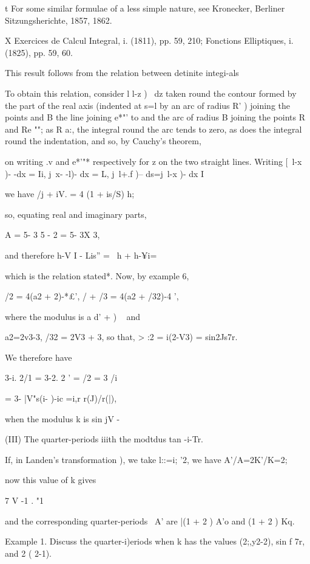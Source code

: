 t For some similar formulae of a less simple nature, see Kronecker,
Berliner Sitzungsherichte, 1857, 1862.

X Exercices de Calcul Integral, i. (1811), pp. 59, 210; Fonctions
Elliptiques, i. (1825), pp. 59, 60.

%
%

This result follows from the relation between detinite integi-als

To obtain this relation, consider l l-z )~ dz taken round the contour
formed by the part of the real axis (indented at s=l by an arc of
radius R' ) joining the points and B the line joining e*"' to and the
arc of radius B joining the points R and Re ""; as R a:, the
integral round the arc tends to zero, as does the integral round the
indentation, and so, by Cauchy's theorem,

on writing .v and e*'"* respectively for z on the two straight lines.
Writing [\ l-x )- -dx = Ii, j\ x- -l)- dx = L, j\ l+.f )-- ds=j\ l-x
)- dx I

we have /j + iV. = 4 (1 + is/S) h;

so, equating real and imaginary parts,

A = 5- 3 5 - 2 = 5- 3X 3,

and therefore h-V I - Lis'' = \ h + h-¥i=

which is the relation stated*. Now, by example 6,

/2 = 4(a2 + 2)-*£', / + /3 = 4(a2 + /32)-4 ',

where the modulus is a d' + ) ~ and

a2=2v3-3, /32 = 2V3 + 3, so that, > :2 = i(2-V3) = sin2Js7r.

We therefore have

3-i. 2/1 = 3-2. 2 ' = /2 = 3 /i

= 3- |V"s(i- )-ic =i,r r(J)/r(|),

when the modulus k is sin jV -

(III) The quarter-periods iiith the modtdus tan -i-Tr.

If, in Landen's transformation ), we take l::=i; '2, we have
A'/A=2K'/K=2;

now this value of k gives

7 V -1 . "1

and the corresponding quarter-periods \, A' are |(1 + 2 ) A'o and (1 +
2 ) Kq.

Example 1. Discuss the quarter-i)eriods when k has the values
(2;,y2-2), sin f 7r, and 2 ( 2-1).

